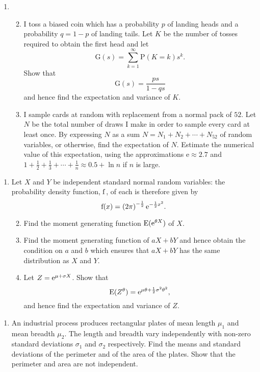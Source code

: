 \documentclass[a4, 11pt]{report}
\newlength{\qspace}
\newcounter{qnumber}
\newenvironment{question}%
 {\vspace{\qspace}
  \begin{enumerate}[\bfseries 1\quad][10]%
    \setcounter{enumi}{\value{qnumber}}%
    \item%
 }
{
  \end{enumerate}
  \filbreak
  \stepcounter{qnumber}
 }
\newenvironment{questionparts}[1][1]%
 {
  \begin{enumerate}[\bfseries (i)]%
    \setcounter{enumii}{#1}
    \addtocounter{enumii}{-1}
    \setlength{\itemsep}{5mm}
    \setlength{\parskip}{8pt}
 }
 {
  \end{enumerate}
 }
\def\e{{\rm e}}
\def\f{{\rm f}}
\begin{document}
\begin{question}
\begin{questionparts}
\item I toss a biased coin which has a probability
$p$ of landing heads and a probability $q=1-p$ of landing tails.
Let $K$ be the number of tosses required to obtain the first head
and let 
\[
\mathrm{G}(s)=\sum_{k=1}^{\infty}\mathrm{P}(K=k)s^{k}.
\]
Show that 
\[
\mathrm{G}(s)=\frac{ps}{1-qs}
\]
and hence find the expectation and variance of $K$. 
\item I sample cards at random with replacement from a normal
pack of $52$. Let $N$ be the total number of draws I make in order
to sample every card at least once. By expressing $N$ as a sum $N=N_{1}+N_{2}+\cdots+N_{52}$
of random variables, or otherwise, find the expectation of $N$. Estimate
the numerical value of this expectation, using the approximations
$\mathrm{e}\approx2.7$ and $1+\frac{1}{2}+\frac{1}{3}+\cdots+\frac{1}{n}\approx0.5+\ln n$
if $n$ is large.
\end{questionparts}
\end{question}

\begin{question}
Let $X$ and $Y$ be independent standard normal random
variables: the probability density function, $\f$, of each
is therefore given by 
\[
\f(x)=\left(2\pi\right)^{-\frac{1}{2}}\e^{-\frac{1}{2}x^{2}}.
\]


\begin{questionparts}
\item  Find the moment generating function $\mathrm{E}(\e^{\theta X})$
of $X$. 
\item  Find the moment generating function of $aX+bY$ and hence
obtain the condition on $a$ and $b$ which ensures that $aX+bY$
has the same distribution as $X$ and $Y$. 
\item  Let $Z=\e^{\mu+\sigma X}$. Show that 
\[
\mathrm{E}(Z^{\theta})=\e^{\mu\theta+\frac{1}{2}\sigma^{2}\theta^{2}},
\]
and hence find the expectation and variance of $Z$.
\end{questionparts}
\end{question}

\begin{question}
An industrial process produces rectangular plates of mean
length $\mu_{1}$ and mean breadth $\mu_{2}$. The length and breadth
vary independently with non-zero standard deviations $\sigma_{1}$
and $\sigma_{2}$ respectively. Find the means and standard deviations
of the perimeter and of the area of the plates. Show that the perimeter
and area are not independent.
\end{question}
	
\end{document}
